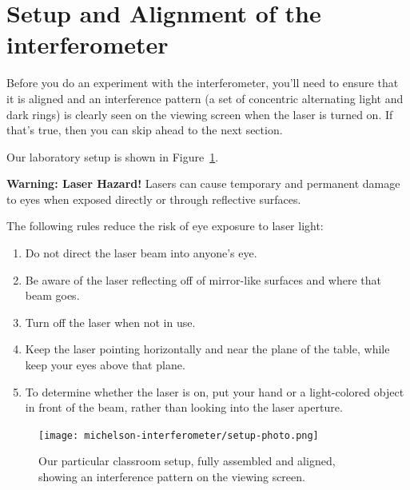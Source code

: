 \section{Setup and Alignment of the interferometer}

Before you do an experiment with the interferometer, you'll need to ensure that it is aligned and an interference pattern (a set of concentric alternating light and dark rings) is clearly seen on the viewing screen when the laser is turned on. If that's true, then you can skip ahead to the next section.

Our laboratory setup is shown in Figure~\ref{mi:fig:setup-photo}.

\begin{framed}
	\textbf{Warning: Laser Hazard!} Lasers can cause temporary and permanent damage to eyes when exposed directly or through reflective surfaces.
	
	The following rules reduce the risk of eye exposure to laser light:
	\begin{enumerate}
		\item Do not direct the laser beam into anyone's eye.
		\item Be aware of the laser reflecting off of mirror-like surfaces and where that beam goes.
		\item Turn off the laser when not in use.
		\item Keep the laser pointing horizontally and near the plane of the table, while keep your eyes above that plane.
		\item To determine whether the laser is on, put your hand or a light-colored object in front of the beam, rather than looking into the laser aperture.
	\end{enumerate}
\end{framed}

\begin{figure}
	\centering
	\texttt{[image: michelson-interferometer/setup-photo.png]}
	\caption{Our particular classroom setup, fully assembled and aligned, showing an interference pattern on the viewing screen.}\label{mi:fig:setup-photo}
\end{figure}

